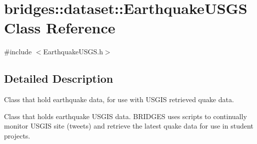 \hypertarget{classbridges_1_1dataset_1_1_earthquake_u_s_g_s}{}\section{bridges\+::dataset\+::Earthquake\+U\+S\+GS Class Reference}
\label{classbridges_1_1dataset_1_1_earthquake_u_s_g_s}


{\ttfamily \#include $<$Earthquake\+U\+S\+G\+S.\+h$>$}



\subsection{Detailed Description}
Class that hold earthquake data, for use with U\+S\+G\+IS retrieved quake data. 

Class that holds earthquake U\+S\+G\+IS data. B\+R\+I\+D\+G\+ES uses scripts to continually monitor U\+S\+G\+IS site (tweets) and retrieve the latest quake data for use in student projects.

